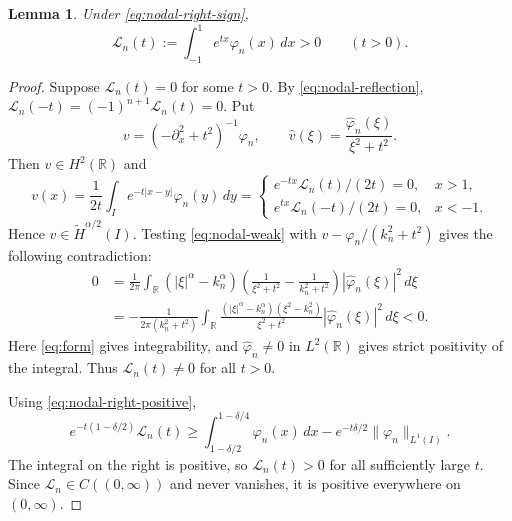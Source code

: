 \documentclass[11pt]{amsart}
\numberwithin{equation}{section}
\newtheorem{lemma}[lemma]{Lemma}
\theoremstyle{remark}
\newcommand{\R}{\mathbb R}
\newcommand{\wt}{\widetilde}
\newcommand{\norm}[2][]{\lVert #2\rVert_{#1}}
\begin{document}
\begin{lemma}\label{lem:nodal-Laplace}
Under \eqref{eq:nodal-right-sign},
\begin{equation}\label{eq:nodal-Laplace-positive}
 \mathcal L_n(t):=\int_{-1}^1e^{tx}\varphi_n(x)\,dx>0\qquad(t>0).
\end{equation}
\end{lemma}
\begin{proof}
Suppose $\mathcal L_n(t)=0$ for some $t>0$. By
\eqref{eq:nodal-reflection},
$\mathcal L_n(-t)=(-1)^{n+1}\mathcal L_n(t)=0$. Put
\begin{equation}\label{eq:nodal-test-resolvent}
 v=(-\partial_x^2+t^2)^{-1}\varphi_n,\qquad
 \widehat v(\xi)=\frac{\widehat\varphi_n(\xi)}{\xi^2+t^2}.
\end{equation}
Then $v\in H^2(\R)$ and
\[
 v(x)=\frac1{2t}\int_Ie^{-t|x-y|}\varphi_n(y)\,dy
 =\begin{cases}
 e^{-tx}\mathcal L_n(t)/(2t)=0,&x>1,\\
 e^{tx}\mathcal L_n(-t)/(2t)=0,&x<-1.
 \end{cases}
\]
Hence $v\in\wt H^{\alpha/2}(I)$. Testing \eqref{eq:nodal-weak} with
$v-\varphi_n/(k_n^2+t^2)$ gives the following contradiction:
\begin{equation}\label{eq:nodal-covariance}
 \begin{aligned}
 0&=\frac1{2\pi}\int_\R (|\xi|^\alpha-k_n^\alpha)
       \left(\frac1{\xi^2+t^2}-\frac1{k_n^2+t^2}\right)
       |\widehat\varphi_n(\xi)|^2\,d\xi\\
  &=-\frac1{2\pi(k_n^2+t^2)}\int_\R
       \frac{(|\xi|^\alpha-k_n^\alpha)(\xi^2-k_n^2)}{\xi^2+t^2}
       |\widehat\varphi_n(\xi)|^2\,d\xi<0.
 \end{aligned}
\end{equation}
Here \eqref{eq:form} gives integrability, and
$\widehat\varphi_n\ne0$ in $L^2(\R)$ gives strict positivity of the integral.
Thus $\mathcal L_n(t)\ne0$ for all $t>0$.

Using \eqref{eq:nodal-right-positive},
\[
 e^{-t(1-\delta/2)}\mathcal L_n(t)
 \ge\int_{1-\delta/2}^{1-\delta/4}\varphi_n(x)\,dx
       -e^{-t\delta/2}\norm[L^1(I)]{\varphi_n}.
\]
The integral on the right is positive, so $\mathcal L_n(t)>0$ for all
sufficiently large $t$. Since $\mathcal L_n\in C((0,\infty))$ and never
vanishes, it is positive everywhere on $(0,\infty)$.
\end{proof}
\end{document}
